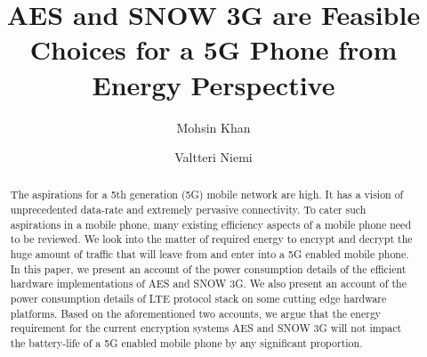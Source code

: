 \documentclass[12pt]{llncs}
\begin{document}
\mainmatter  %

\title{AES and SNOW 3G are Feasible Choices for a 5G Phone from Energy Perspective}


%
%
\author{Mohsin Khan%
\and Valtteri Niemi}  %


%
%

\maketitle


\begin{abstract}
The aspirations for a 5th generation (5G) mobile network are high. It has a vision of unprecedented data-rate and extremely pervasive connectivity. To cater such aspirations in a mobile phone, many existing efficiency aspects of a mobile phone need to be reviewed. We look into the matter of required energy to encrypt and decrypt the huge amount of traffic that will leave from and enter into a 5G enabled mobile phone. In this paper, we present an account of the power consumption details of the efficient hardware implementations of AES and SNOW 3G. We also present an account of the power consumption details of LTE protocol stack on some cutting edge hardware platforms. Based on the aforementioned two accounts, we argue that the energy requirement for the current encryption systems AES and SNOW 3G will not impact the battery-life of a 5G enabled mobile phone by any significant proportion.
\end{abstract}
\end{document}
